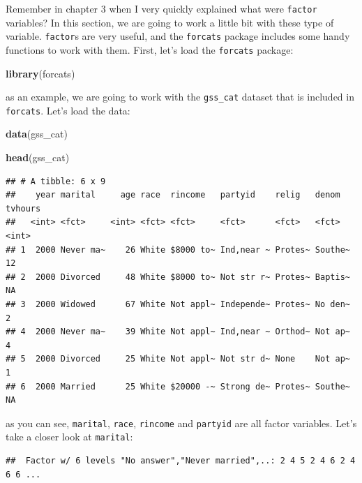 \documentclass[]{gitbook}
\newenvironment{Shaded}{\begin{snugshade}}{\end{snugshade}}
\newcommand{\KeywordTok}[1]{\textcolor[rgb]{0.13,0.29,0.53}{\textbf{#1}}}
\newcommand{\NormalTok}[1]{#1}
\newcommand{\OperatorTok}[1]{\textcolor[rgb]{0.81,0.36,0.00}{\textbf{#1}}}
\theoremstyle{definition}
\theoremstyle{definition}
\theoremstyle{definition}
\theoremstyle{remark}
\begin{document}
Remember in chapter 3 when I very quickly explained what were
\texttt{factor} variables? In this section, we are going to work a
little bit with these type of variable. \texttt{factor}s are very
useful, and the \texttt{forcats} package includes some handy functions
to work with them. First, let's load the \texttt{forcats} package:

\begin{Shaded}
\begin{Highlighting}[]
\KeywordTok{library}\NormalTok{(forcats)}
\end{Highlighting}
\end{Shaded}

as an example, we are going to work with the \texttt{gss\_cat} dataset
that is included in \texttt{forcats}. Let's load the data:

\begin{Shaded}
\begin{Highlighting}[]
\KeywordTok{data}\NormalTok{(gss_cat)}

\KeywordTok{head}\NormalTok{(gss_cat)}
\end{Highlighting}
\end{Shaded}

\begin{verbatim}
## # A tibble: 6 x 9
##    year marital     age race  rincome   partyid    relig   denom   tvhours
##   <int> <fct>     <int> <fct> <fct>     <fct>      <fct>   <fct>     <int>
## 1  2000 Never ma~    26 White $8000 to~ Ind,near ~ Protes~ Southe~      12
## 2  2000 Divorced     48 White $8000 to~ Not str r~ Protes~ Baptis~      NA
## 3  2000 Widowed      67 White Not appl~ Independe~ Protes~ No den~       2
## 4  2000 Never ma~    39 White Not appl~ Ind,near ~ Orthod~ Not ap~       4
## 5  2000 Divorced     25 White Not appl~ Not str d~ None    Not ap~       1
## 6  2000 Married      25 White $20000 -~ Strong de~ Protes~ Southe~      NA
\end{verbatim}

as you can see, \texttt{marital}, \texttt{race}, \texttt{rincome} and
\texttt{partyid} are all factor variables. Let's take a closer look at
\texttt{marital}:

\begin{Shaded}
\end{Shaded}

\begin{verbatim}
##  Factor w/ 6 levels "No answer","Never married",..: 2 4 5 2 4 6 2 4 6 6 ...
\end{verbatim}
\end{document}
